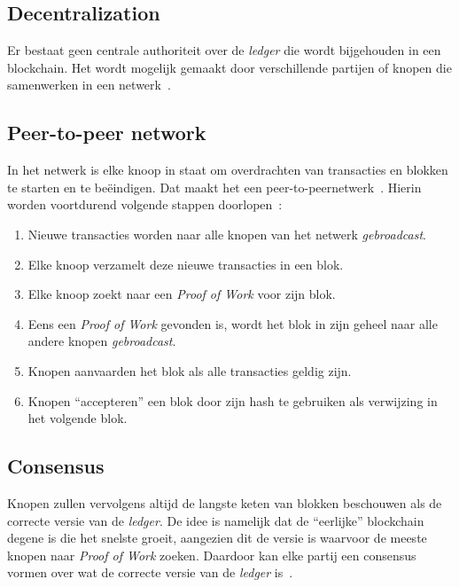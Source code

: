 \subsection{Decentralization}
\label{sub:decentralization}

Er bestaat geen centrale authoriteit over de \textit{ledger} die wordt bijgehouden in een blockchain. Het wordt mogelijk gemaakt door verschillende partijen of knopen die samenwerken in een netwerk~\autocite{Anita2019}.

\subsection{Peer-to-peer network}
\label{sub:peer-to-peer-network}

In het netwerk is elke knoop in staat om overdrachten van transacties en blokken te starten en te beëindigen. Dat maakt het een peer-to-peernetwerk~\autocite{Davidson2016}. Hierin worden voortdurend volgende stappen doorlopen~\autocite{Nakamoto2008}:

\begin{enumerate}
	\item Nieuwe transacties worden naar alle knopen van het netwerk \textit{gebroadcast}.
	\item Elke knoop verzamelt deze nieuwe transacties in een blok.
	\item Elke knoop zoekt naar een \textit{Proof of Work} voor zijn blok.
	\item Eens een \textit{Proof of Work} gevonden is, wordt het blok in zijn geheel naar alle andere knopen \textit{gebroadcast}.
	\item Knopen aanvaarden het blok als alle transacties geldig zijn.
	\item Knopen ``accepteren'' een blok door zijn hash te gebruiken als verwijzing in het volgende blok.
\end{enumerate}

\pagebreak

\subsection{Consensus}
\label{sub:consensus}

Knopen zullen vervolgens altijd de langste keten van blokken beschouwen als de correcte versie van de \textit{ledger}. De idee is namelijk dat de ``eerlijke'' blockchain degene is die het snelste groeit, aangezien dit de versie is waarvoor de meeste knopen naar \textit{Proof of Work} zoeken. Daardoor kan elke partij een consensus vormen over wat de correcte versie van de \textit{ledger} is~\autocite{Anita2019}.

